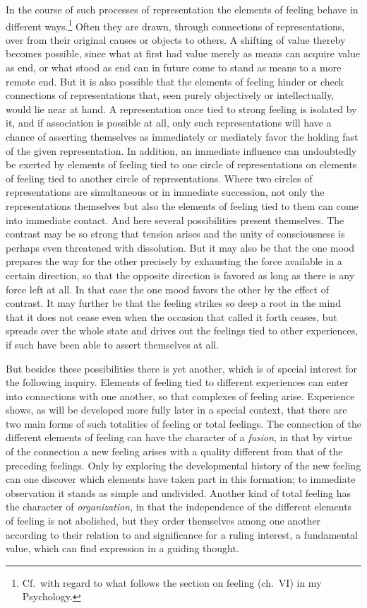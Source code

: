\documentclass[12pt]{book}
\newcommand{\opage}[1]{\marginnote{\footnotesize\textit{[#1]}}}
\begin{document}
In the course of such processes of representation the elements of feeling
behave in different ways.\footnote{Cf.\ with regard to what follows the section
on feeling (ch.~VI) in my Psychology.} Often they are drawn, through
connections of representations, over from their original causes or objects to
others. A shifting of value thereby becomes possible, since what at first had
value merely as means can acquire value as end, or what stood as end can in
future come to stand as means to a more remote end. But it is also possible that
the elements of feeling hinder or check connections of representations that,
seen purely objectively or intellectually, \opage{18}would lie near at hand. A
representation once tied to strong feeling is isolated by it, and if association
is possible at all, only such representations will have a chance of asserting
themselves as immediately or mediately favor the holding fast of the given
representation. In addition, an immediate influence can undoubtedly be exerted by
elements of feeling tied to one circle of representations on elements of feeling
tied to another circle of representations. Where two circles of representations
are simultaneous or in immediate succession, not only the representations
themselves but also the elements of feeling tied to them can come into immediate
contact. And here several possibilities present themselves. The contrast may be
so strong that tension arises and the unity of consciousness is perhaps even
threatened with dissolution. But it may also be that the one mood prepares the
way for the other precisely by exhausting the force available in a certain
direction, so that the opposite direction is favored as long as there is any
force left at all. In that case the one mood favors the other by the effect of
contrast. It may further be that the feeling strikes so deep a root in the mind
that it does not cease even when the occasion that called it forth ceases, but
spreads over the whole state and drives out the feelings tied to other
experiences, if such have been able to assert themselves at all.

But besides these possibilities there is yet another, which is of special
interest for the following inquiry. Elements of feeling tied to different
experiences can enter into connections with one another, so that complexes of
feeling arise. Experience shows, as will be developed more fully later in a
special context, that there are two main forms of such totalities of feeling or
total feelings. The connection of the different elements of feeling can have the
character of a \emph{fusion}, in that by virtue of the connection a new feeling
arises with a quality different from that of the preceding feelings. Only by
exploring the developmental history of the new feeling can one discover which
elements have taken part in this formation; to immediate observation it stands as
simple and undivided. Another kind of total feeling has the character of
\emph{organization}, in that the independence of the \opage{19}different
elements of feeling is not abolished, but they order themselves among one another
according to their relation to and significance for a ruling interest, a
fundamental value, which can find expression in a guiding thought.
\end{document}
